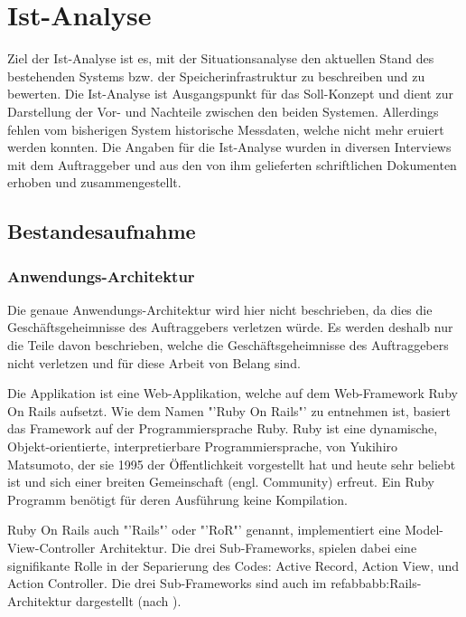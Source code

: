 
\cleardoublepage
\chapter{Ist-Analyse}
Ziel der Ist-Analyse ist es, mit der Situationsanalyse den aktuellen Stand des bestehenden Systems bzw. der Speicherinfrastruktur zu beschreiben und zu bewerten. Die Ist-Analyse ist Ausgangspunkt für das Soll-Konzept und dient zur Darstellung der Vor- und Nachteile zwischen den beiden Systemen. Allerdings fehlen vom bisherigen System historische Messdaten, welche nicht mehr eruiert werden konnten.
Die Angaben für die Ist-Analyse wurden in diversen Interviews mit dem Auftraggeber und aus den von ihm gelieferten schriftlichen Dokumenten erhoben und zusammengestellt. 

\section{Bestandesaufnahme}
\subsection{Anwendungs-Architektur}
Die genaue Anwendungs-Architektur wird hier nicht beschrieben, da dies die Geschäftsgeheimnisse des Auftraggebers verletzen würde. Es werden deshalb nur die Teile davon beschrieben, welche die Geschäftsgeheimnisse des Auftraggebers nicht verletzen und für diese Arbeit von Belang sind.

Die Applikation ist eine Web-Applikation, welche auf dem Web-Framework Ruby On Rails aufsetzt.
Wie dem Namen "'Ruby On Rails"' zu entnehmen ist, basiert das Framework auf der Programmiersprache Ruby. Ruby ist eine dynamische, Objekt-orientierte, interpretierbare Programmiersprache, von Yukihiro Matsumoto, der sie 1995 der Öffentlichkeit vorgestellt hat und heute sehr beliebt ist und sich einer breiten Gemeinschaft (engl. Community) erfreut. Ein Ruby Programm benötigt für deren Ausführung keine Kompilation.

Ruby On Rails auch "'Rails"' oder "'RoR"' genannt, implementiert eine Model-View-Controller Architektur. Die drei Sub-Frameworks, spielen dabei eine signifikante Rolle in der Separierung des Codes: Active Record, Action View, und Action Controller. Die drei Sub-Frameworks sind auch im refabb{abb:Rails-Architektur} dargestellt (nach \cite{Bachle2007}).

